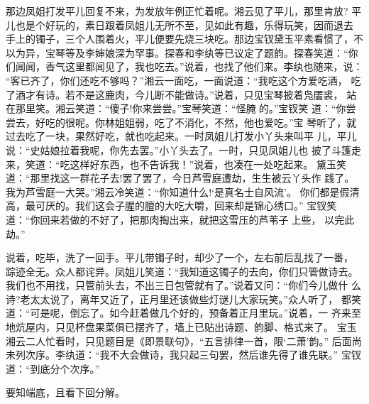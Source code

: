 那边凤姐打发平儿回复不来，为发放年例正忙着呢。湘云见了平儿，那里肯放?
平儿也是个好玩的，素日跟着凤姐儿无所不至，见如此有趣，乐得玩笑，因而退去
手上的镯子，三个人围着火，平儿便要先烧三块吃。那边宝钗黛玉平素看惯了，不
以为异，宝琴等及李婶娘深为罕事。探春和李纨等已议定了题韵。探春笑道：“你
们闻闻，香气这里都闻见了，我也吃去。”说着，也找了他们来。李纨也随来，说：
“客已齐了，你们还吃不够吗？”湘云一面吃，一面说道：“我吃这个方爱吃酒，
吃了酒才有诗。若不是这鹿肉，今儿断不能做诗。”说着，只见宝琴披着凫靥裘，
站在那里笑。湘云笑道：“傻子!你来尝尝。”宝琴笑道：“怪腌的。”宝钗笑
道：“你尝尝去，好吃的很呢。你林姐姐弱，吃了不消化，不然，他也爱吃。”宝
琴听了，就过去吃了一块，果然好吃，就也吃起来。一时凤姐儿打发小丫头来叫平
儿，平儿说：“史姑娘拉着我呢，你先去罢。”小丫头去了。一时，只见凤姐儿也
披了斗篷走来，笑道：“吃这样好东西，也不告诉我！”说着，也凑在一处吃起来。
黛玉笑道：“那里找这一群花子去!罢了罢了，今日芦雪庭遭劫，生生被云丫头作
践了。我为芦雪庭一大哭。”湘云冷笑道：“你知道什么!‘是真名士自风流’。
你们都是假清高，最可厌的。我们这会子腥的膻的大吃大嚼，回来却是锦心绣口。”
宝钗笑道：“你回来若做的不好了，把那肉掏出来，就把这雪压的芦苇子上些，
以完此劫。”

说着，吃毕，洗了一回手。平儿带镯子时，却少了一个，左右前后乱找了一番，
踪迹全无。众人都诧异。凤姐儿笑道：“我知道这镯子的去向，你们只管做诗去。
我们也不用找，只管前头去，不出三日包管就有了。”说着又问：“你们今儿做什
么诗?老太太说了，离年又近了，正月里还该做些灯谜儿大家玩笑。”众人听了，
都笑道：“可是呢，倒忘了。如今赶着做几个好的，预备着正月里玩。”说着，一
齐来至地炕屋内，只见杯盘果菜俱已摆齐了，墙上已贴出诗题、韵脚、格式来了。
宝玉湘云二人忙看时，只见题目是《即景联句》，“五言排律一首，限‘二萧’韵。”
后面尚未列次序。李纨道：“我不大会做诗，我只起三句罢，然后谁先得了谁先联。”
宝钗道：“到底分个次序。”

要知端底，且看下回分解。